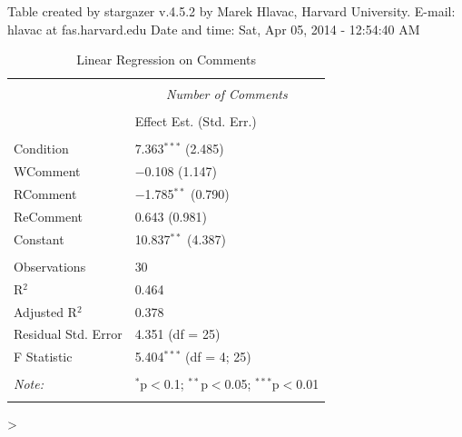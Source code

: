 \documentclass{sigchi}
\begin{document}
 Table created by stargazer v.4.5.2 by Marek Hlavac, Harvard University. E-mail: hlavac at fas.harvard.edu
 Date and time: Sat, Apr 05, 2014 - 12:54:40 AM
\begin{table}[!htbp] \centering 
 \caption{ Linear Regression on Comments} 
 \label{} 
\begin{tabular}{@{\extracolsep{6pt}}ll} 
\\[-1.8ex]\hline 
\hline \\[-1.8ex] 
 & \multicolumn{1}{c}{\textit{Number of Comments}} \\ 
\cline{2-2} 
\\[-1.8ex] &  Effect Est. (Std. Err.) \\ 
\hline \\[-1.8ex] 
 Condition & 7.363$^{***}$  (2.485) \\ 

 WComment & $-$0.108  (1.147) \\ 
  
 RComment & $-$1.785$^{**}$  (0.790) \\ 
 
 ReComment & 0.643 (0.981) \\ 
  
 Constant & 10.837$^{**}$  (4.387) \\ 
 
\hline \\[-1.8ex] 
Observations & 30 \\ 
R$^{2}$ & 0.464 \\ 
Adjusted R$^{2}$ & 0.378 \\ 
Residual Std. Error & 4.351 (df = 25) \\ 
F Statistic & 5.404$^{***}$ (df = 4; 25) \\ 
\hline 
\hline \\[-1.8ex] 
\textit{Note:}  & \multicolumn{1}{r}{$^{*}$p$<$0.1; $^{**}$p$<$0.05; $^{***}$p$<$0.01} \\ 
\normalsize 
\end{tabular} 
\end{table} 
> 
\end{document}
